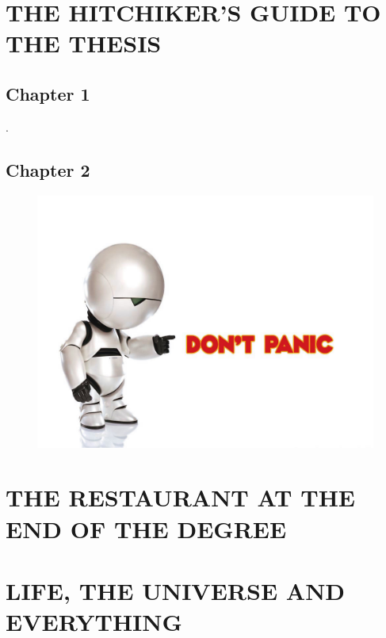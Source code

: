 
\graphicspath{{2018/figs/}}

\section{THE HITCHIKER'S GUIDE TO THE THESIS}

\subsection{Chapter 1}

\lipsum[3-4]\cite{adams1995hitchhikers}.

\subsection{Chapter 2}

\begin{figure}[h]
\includegraphics[width=\textwidth]{do-not-panic.png}
\centering
\end{figure}

\lipsum[3-4]

\section{THE RESTAURANT AT THE END OF THE DEGREE}

\lipsum[3-4]

\section{LIFE, THE UNIVERSE AND EVERYTHING}

